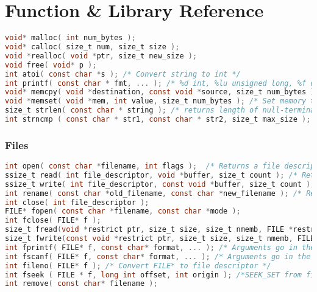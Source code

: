 \documentclass[legalpaper,10pt]{article}
\begin{document}
\section*{Function \& Library Reference}

\lstset{numbers=none}

\begin{lstlisting}[language=C]
void* malloc( int num_bytes );
void* calloc( size_t num, size_t size );
void *realloc( void *ptr, size_t new_size );
void free( void* p );
int atoi( const char *s ); /* Convert string to int */
int printf( const char * fmt, ... ); /* %d int, %lu unsigned long, %f double,  %s string, \n newline, ...=args */
void* memcpy( void *destination, const void *source, size_t num_bytes ); /* Returns destination */
void *memset( void *mem, int value, size_t num_bytes ); /* Set memory to 0 */
size_t strlen( const char * string ); /* returns length of null-terminated string, not counting the terminator */
int strncmp ( const char * str1, const char * str2, size_t max_size ); /* return 0 if strings equal */
\end{lstlisting}

\subsubsection*{Files}
\begin{lstlisting}[language=C]
int open( const char *filename, int flags );  /* Returns a file descriptor if successful, -1 on error */
ssize_t read( int file_descriptor, void *buffer, size_t count ); /* Returns number of bytes read */
ssize_t write( int file_descriptor, const void *buffer, size_t count ); /* Returns number of bytes written */
int rename( const char *old_filename, const char *new_filename ); /* Returns 0 on success */
int close( int file_descriptor ); 
FILE* fopen( const char *filename, const char *mode );
int fclose( FILE* f );
size_t fread(void *restrict ptr, size_t size, size_t nmemb, FILE *restrict stream);
size_t fwrite(const void *restrict ptr, size_t size, size_t nmemb, FILE *restrict stream);
int fprintf( FILE* f, const char* format, ... ); /* Arguments go in the ...  */
int fscanf( FILE* f, const char* format, ... ); /* Arguments go in the ...  */
int fileno( FILE* f ); /* Convert FILE* to file descriptor */
int fseek ( FILE * f, long int offset, int origin ); /*SEEK_SET from file start. SEEK_CUR from current loc.*/
int remove( const char* filename );
\end{lstlisting}
\end{document}
